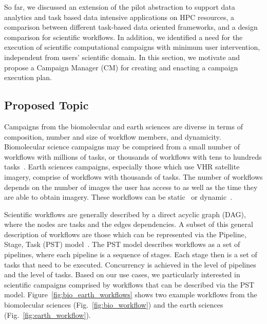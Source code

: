 \label{research}
So far, we discussed an extension of the pilot abstraction to support data analytics and task based data intensive applications on HPC resources, a comparison between different task-based data oriented frameworks, and a design comparison for scientific workflows.
In addition, we identified a need for the execution of scientific computational campaigns with minimum user intervention, independent from users' scientific domain.
In this section, we motivate and propose a Campaign Manager (CM) for creating and enacting a campaign execution plan.


\subsection{Proposed Topic}
Campaigns from the biomolecular and earth sciences are diverse in terms of composition, number and size of workflow members, and dynamicity.
Biomolecular science campaigns may be comprised from a small number of workflows with millions of tasks, or thousands of workflows with tens to hundreds tasks~\cite{dakka2018high}. 
Earth sciences campaigns, especially those which use VHR satellite imagery, comprise of workflows with thousands of tasks.
The number of workflows depends on the number of images the user has access to as well as the time they are able to obtain imagery.
These workflows can be static~\cite{paraskevakos2019workflow} or dynamic~\cite{dakka2018high}.

Scientific workflows are generally described by a direct acyclic graph (DAG), where the nodes are tasks and the edges dependencies.
A subset of this general description of workflows are those which can be represented via the Pipeline, Stage, Task (PST) model~\cite{balasubramanian2018harnessing}.
The PST model describes workflows as a set of pipelines, where each pipeline is a sequence of stages.
Each stage then is a set of tasks that need to be executed.
Concurrency is achieved in the level of pipelines and the level of tasks. 
Based on our use cases, we particularly interested in scientific campaigns comprised by workflows that can be described via the PST model.
Figure~\ref{fig:bio_earth_workflows} shows two example workflows from the biomolecular sciences (Fig.~\ref{fig:bio_workflow}) and the earth sciences (Fig.~\ref{fig:earth_workflow}). 

